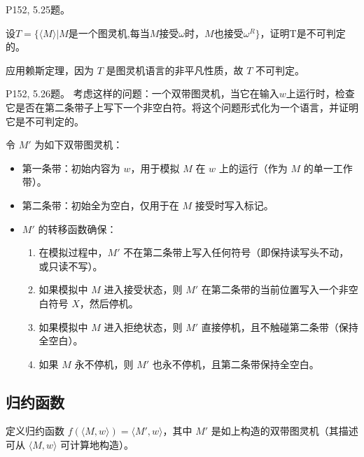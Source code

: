 \documentclass[11pt,addpoints,answers]{exam}
\begin{document}
\begin{questions}
\begin{parts}
\end{parts}







\question P152, 5.25题。

设$T=\{\langle M\rangle|M\text{是一个图灵机,每当}M\text{接受}\omega \text{时，}M\text{也接受}\omega^{R}\}$，证明T是不可判定的。

\begin{solution}
	应用赖斯定理，因为 $T$ 是图灵机语言的非平凡性质，故 $T$ 不可判定。
\end{solution}




\question P152, 5.26题。
考虑这样的问题：一个双带图灵机，当它在输入$w$上运行时，检查它是否在第二条带子上写下一个非空白符。将这个问题形式化为一个语言，并证明它是不可判定的。
\begin{solution}
	令 $M'$ 为如下双带图灵机：
\begin{itemize}
    \item 第一条带：初始内容为 $w$，用于模拟 $M$ 在 $w$ 上的运行（作为 $M$ 的单一工作带）。
    \item 第二条带：初始全为空白，仅用于在 $M$ 接受时写入标记。
    \item $M'$ 的转移函数确保：
        \begin{enumerate}
            \item 在模拟过程中，$M'$ 不在第二条带上写入任何符号（即保持读写头不动，或只读不写）。
            \item 如果模拟中 $M$ 进入接受状态，则 $M'$ 在第二条带的当前位置写入一个非空白符号 $X$，然后停机。
            \item 如果模拟中 $M$ 进入拒绝状态，则 $M'$ 直接停机，且不触碰第二条带（保持全空白）。
            \item 如果 $M$ 永不停机，则 $M'$ 也永不停机，且第二条带保持全空白。
        \end{enumerate}
\end{itemize}

\subsection*{归约函数}
定义归约函数 $f(\langle M, w \rangle) = \langle M', w \rangle$，其中 $M'$ 是如上构造的双带图灵机（其描述可从 $\langle M, w \rangle$ 可计算地构造）。


\end{solution}
\end{questions}
\end{document}
